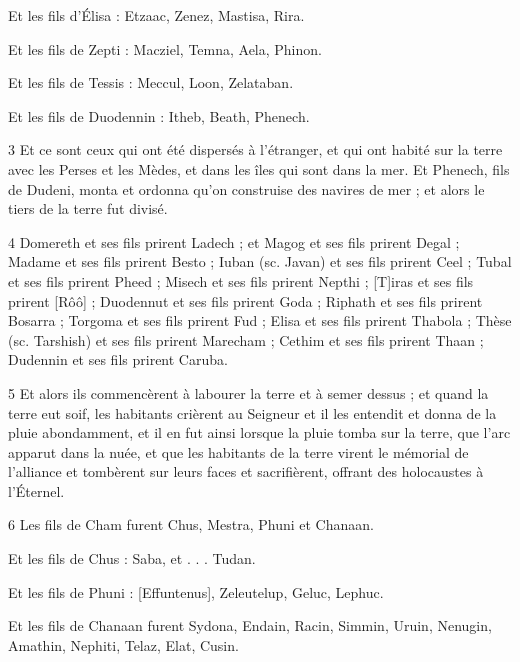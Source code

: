 \par Et les fils d'Élisa : Etzaac, Zenez, Mastisa, Rira.

\par Et les fils de Zepti : Macziel, Temna, Aela, Phinon.

\par Et les fils de Tessis : Meccul, Loon, Zelataban.

\par Et les fils de Duodennin : Itheb, Beath, Phenech.

\par 3 Et ce sont ceux qui ont été dispersés à l'étranger, et qui ont habité sur la terre avec les Perses et les Mèdes, et dans les îles qui sont dans la mer. Et Phenech, fils de Dudeni, monta et ordonna qu'on construise des navires de mer ; et alors le tiers de la terre fut divisé.

\par 4 Domereth et ses fils prirent Ladech ; et Magog et ses fils prirent Degal ; Madame et ses fils prirent Besto ; Iuban (sc. Javan) et ses fils prirent Ceel ; Tubal et ses fils prirent Pheed ; Misech et ses fils prirent Nepthi ; [T]iras et ses fils prirent [Rôô] ; Duodennut et ses fils prirent Goda ; Riphath et ses fils prirent Bosarra ; Torgoma et ses fils prirent Fud ; Elisa et ses fils prirent Thabola ; Thèse (sc. Tarshish) et ses fils prirent Marecham ; Cethim et ses fils prirent Thaan ; Dudennin et ses fils prirent Caruba.

\par 5 Et alors ils commencèrent à labourer la terre et à semer dessus ; et quand la terre eut soif, les habitants crièrent au Seigneur et il les entendit et donna de la pluie abondamment, et il en fut ainsi lorsque la pluie tomba sur la terre, que l'arc apparut dans la nuée, et que les habitants de la terre virent le mémorial de l'alliance et tombèrent sur leurs faces et sacrifièrent, offrant des holocaustes à l'Éternel.

\par 6 Les fils de Cham furent Chus, Mestra, Phuni et Chanaan.

\par Et les fils de Chus : Saba, et . . . Tudan.

\par Et les fils de Phuni : [Effuntenus], Zeleutelup, Geluc, Lephuc.

\par Et les fils de Chanaan furent Sydona, Endain, Racin, Simmin, Uruin, Nenugin, Amathin, Nephiti, Telaz, Elat, Cusin.


